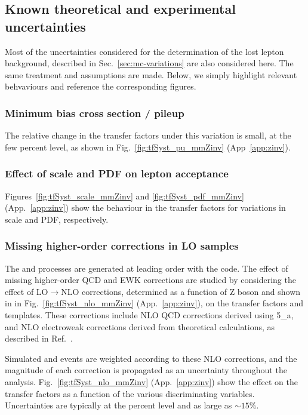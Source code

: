 \subsection{Known theoretical and experimental uncertainties}
\label{sec:mc-variations-zinv}

Most of the uncertainties considered for the determination of the lost
lepton background, described in Sec.~\ref{sec:mc-variations} are also
considered here. The same treatment and assumptions are made. Below,
we simply highlight relevant behvaviours and reference the
corresponding figures. 

\subsubsection{Minimum bias cross section / pileup}
\label{sec:tfSyst_pu-zinv}

The relative change in the transfer factors under this variation is
small, at the few percent level, as shown in
Fig.~\ref{fig:tfSyst_pu_mmZinv} (App~\ref{app:zinv}).

\subsubsection{Effect of scale and PDF on lepton acceptance}
\label{sec:tfSyst_pdf-zinv}

Figures~\ref{fig:tfSyst_scale_mmZinv} and \ref{fig:tfSyst_pdf_mmZinv}
(App.~\ref{app:zinv}) show the behaviour in the transfer factors for
variations in scale and PDF, respectively.

\subsubsection{Missing higher-order corrections in LO \texorpdfstring{\MADGRAPH}{MadGraph}
  samples}
\label{sec:nlo-zinv}

The \zmmj and \znunuj processes are generated at leading order with
the \MADGRAPH code. The effect of missing higher-order QCD and EWK
corrections are studied by considering the effect of
LO$\rightarrow$NLO corrections, determined as a function of Z boson
\Pt and shown in in Fig.~\ref{fig:tfSyst_nlo_mmZinv}
(App.~\ref{app:zinv}), on the transfer factors and \HTmiss templates.
These corrections include
NLO QCD corrections derived using {\MADGRAPH{}5\_a\MCATNLO},
and NLO electroweak corrections derived from theoretical calculations,
as described in Ref.~\cite{monojet_AN_36fb}.

Simulated \zmmj and \znunuj events are weighted according to these NLO
corrections, and the magnitude of each correction is propagated as an
uncertainty throughout the analysis. Fig.~\ref{fig:tfSyst_nlo_mmZinv}
(App.~\ref{app:zinv}) show the effect on the transfer factors as a
function of the various discriminating variables. Uncertainties are
typically at the percent level and as large as $\sim 15\%$.

